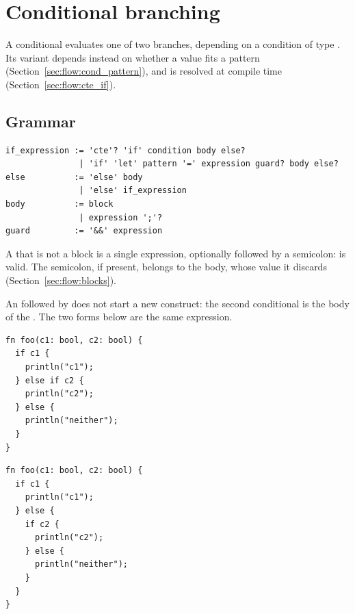 \vfill%
\pagebreak
\section{Conditional branching}%
\label{sec:flow:if_else}

A conditional evaluates one of two branches, depending on a condition of type
. Its variant  depends instead on whether a value fits
a pattern (Section~\ref{sec:flow:cond_pattern}), and  is resolved
at compile time (Section~\ref{sec:flow:cte_if}).

\subsection{Grammar}

\begin{lstlisting}[style=grammarVerb]
if_expression := 'cte'? 'if' condition body else?
               | 'if' 'let' pattern '=' expression guard? body else?
else          := 'else' body
               | 'else' if_expression
body          := block
               | expression ';'?
guard         := '&&' expression
\end{lstlisting}

A  that is not a block is a single expression, optionally followed
by a semicolon:  is valid. The
semicolon, if present, belongs to the body, whose value it discards
(Section~\ref{sec:flow:blocks}).

An  followed by  does not start a new construct: the
second conditional is the body of the . The two forms below are the
same expression.

\begin{minipage}[t][][t]{0.47\linewidth}
\begin{lstlisting}[style=coloredverbatim, caption=A conditional as the body of \token{else}]
fn foo(c1: bool, c2: bool) {
  if c1 {
    println("c1");
  } else if c2 {
    println("c2");
  } else {
    println("neither");
  }
}
\end{lstlisting}
\end{minipage}\hspace{10pt}%
\begin{minipage}[t][][t]{0.47\linewidth}
\begin{lstlisting}[style=coloredverbatim, caption=A block as the body of \token{else}]
fn foo(c1: bool, c2: bool) {
  if c1 {
    println("c1");
  } else {
    if c2 {
      println("c2");
    } else {
      println("neither");
    }
  }
}
\end{lstlisting}
\end{minipage}

